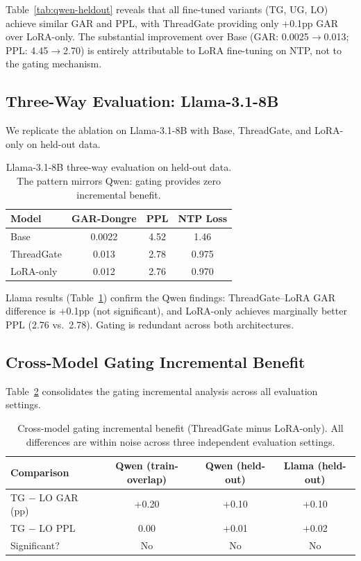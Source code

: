 \documentclass[11pt,a4paper]{article}
\begin{document}
Table~\ref{tab:qwen-heldout} reveals that all fine-tuned variants (TG, UG, LO) achieve similar GAR and PPL, with ThreadGate providing only +0.1pp GAR over LoRA-only.
The substantial improvement over Base (GAR: 0.0025$\to$0.013; PPL: 4.45$\to$2.70) is entirely attributable to LoRA fine-tuning on NTP, not to the gating mechanism.

\subsection{Three-Way Evaluation: Llama-3.1-8B}

We replicate the ablation on Llama-3.1-8B with Base, ThreadGate, and LoRA-only on held-out data.

\begin{table}[h]
\centering
\caption{Llama-3.1-8B three-way evaluation on held-out data. The pattern mirrors Qwen: gating provides zero incremental benefit.}
\label{tab:llama-heldout}
\begin{tabular}{lccc}
\toprule
\textbf{Model} & \textbf{GAR-Dongre} & \textbf{PPL} & \textbf{NTP Loss} \\
\midrule
Base        & 0.0022 & 4.52 & 1.46 \\
ThreadGate  & 0.013  & 2.78 & 0.975 \\
LoRA-only   & 0.012  & 2.76 & 0.970 \\
\bottomrule
\end{tabular}
\end{table}

Llama results (Table~\ref{tab:llama-heldout}) confirm the Qwen findings: ThreadGate--LoRA GAR difference is +0.1pp (not significant), and LoRA-only achieves marginally better PPL (2.76 vs.\ 2.78).
Gating is redundant across both architectures.

\subsection{Cross-Model Gating Incremental Benefit}

Table~\ref{tab:incremental} consolidates the gating incremental analysis across all evaluation settings.

\begin{table}[h]
\centering
\caption{Cross-model gating incremental benefit (ThreadGate minus LoRA-only). All differences are within noise across three independent evaluation settings.}
\label{tab:incremental}
\begin{tabular}{lccc}
\toprule
\textbf{Comparison} & \textbf{Qwen (train-overlap)} & \textbf{Qwen (held-out)} & \textbf{Llama (held-out)} \\
\midrule
TG $-$ LO GAR (pp) & +0.20 & +0.10 & +0.10 \\
TG $-$ LO PPL       & 0.00  & +0.01 & +0.02 \\
Significant?         & No    & No    & No \\
\bottomrule
\end{tabular}
\end{table}
\end{document}
